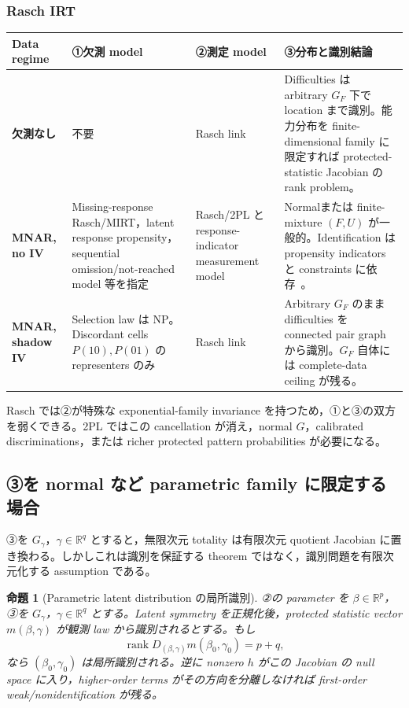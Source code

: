 \documentclass[11pt,a4paper]{ltjsarticle}
\newtheorem{proposition}{命題}[section]
\theoremstyle{remark}
\newcommand{\R}{\mathbb R}
\newcommand{\rank}{\operatorname{rank}}
\begin{document}
\subsubsection{Rasch IRT}
\begin{center}
\footnotesize
\begin{tabularx}{0.99\textwidth}{>{\bfseries}p{33mm}p{34mm}p{34mm}X}
\toprule
Data regime & ①欠測 model & ②測定 model & ③分布と識別結論\\
\midrule
欠測なし
& 不要
& Rasch link
& Difficulties は arbitrary $G_F$ 下で location まで識別。能力分布を finite-dimensional family に限定すれば protected-statistic Jacobian の rank problem。\\
\addlinespace
MNAR, no IV
& Missing-response Rasch/MIRT，latent response propensity，sequential omission/not-reached model 等を指定
& Rasch/2PL と response-indicator measurement model
& Normalまたは finite-mixture $(F,U)$ が一般的。Identification は propensity indicators と constraints に依存~\cite{HolmanGlas2005,RoseVonDavierNagengast2017,WuMaChen2026}。\\
\addlinespace
MNAR, shadow IV
& Selection law は NP。Discordant cells $P(10),P(01)$ の representers のみ
& Rasch link
& Arbitrary $G_F$ のまま difficulties を connected pair graph から識別。$G_F$ 自体には complete-data ceiling が残る。\\
\bottomrule
\end{tabularx}
\end{center}

Rasch では②が特殊な exponential-family invariance を持つため，①と③の双方を弱くできる。2PL ではこの cancellation が消え，normal $G$，calibrated discriminations，または richer protected pattern probabilities が必要になる。

\subsection{③を normal など parametric family に限定する場合}

③を $G_\gamma$，$\gamma\in\R^q$ とすると，無限次元 totality は有限次元 quotient Jacobian に置き換わる。しかしこれは識別を保証する theorem ではなく，識別問題を有限次元化する assumption である。

\begin{proposition}[Parametric latent distribution の局所識別]
\label{prop:parametriclatentjacobian}
②の parameter を $\beta\in\R^p$，③を $G_\gamma$，$\gamma\in\R^q$ とする。Latent symmetry を正規化後，protected statistic vector $m(\beta,\gamma)$ が観測 law から識別されるとする。もし
\[
 \rank D_{(\beta,\gamma)}m(\beta_0,\gamma_0)=p+q,
\]
なら $(\beta_0,\gamma_0)$ は局所識別される。逆に nonzero $h$ がこの Jacobian の null space に入り，higher-order terms がその方向を分離しなければ first-order weak/nonidentification が残る。
\end{proposition}
\end{document}
